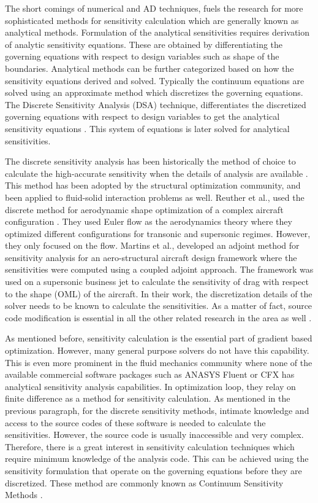The short comings of numerical and AD techniques, fuels the research for more sophisticated methods for sensitivity calculation which are generally known as analytical methods. Formulation of the analytical sensitivities requires derivation of analytic sensitivity equations. These are obtained by differentiating the governing equations with respect to design variables such as shape of the boundaries. Analytical methods can be further categorized based on how the sensitivity equations derived and solved. Typically the continuum equations are solved using an approximate method which discretizes the governing equations. The Discrete Sensitivity Analysis (DSA) technique, differentiates the discretized governing equations with respect to design variables to get the analytical sensitivity equations \cite{choi2006structural}. This system of equations is later solved for analytical sensitivities.  

The discrete sensitivity analysis has been historically the method of choice to calculate the high-accurate sensitivity when the details of analysis are available \cite{arora1979methods}. This method has been adopted by the structural optimization community, and been applied to fluid-solid interaction problems as well. Reuther et al., used the discrete method for aerodynamic shape optimization of a complex aircraft configuration \cite{reuther1999constrained}. They used Euler flow as the aerodynamics theory where they optimized different configurations for transonic and supersonic regimes. However, they only focused on the flow. Martins et al., developed an adjoint method for sensitivity analysis for an aero-structural aircraft design framework where the sensitivities were computed using a coupled adjoint approach. The framework was used on a supersonic business jet to calculate the sensitivity of drag with respect to the shape (OML) of the aircraft. In their work, the discretization details of the solver needs to be known to calculate the sensitivities. As a matter of fact, source code modification is essential in all the other related research in the area as well \cite{gamboa2009optimization, pandya1997gradient, kim2001aerodynamic}.

As mentioned before, sensitivity calculation is the essential part of gradient based optimization. However, many general purpose solvers do not have this capability. This is even more prominent in the fluid mechanics community where none of the available commercial software packages such as ANASYS Fluent or CFX has analytical sensitivity analysis capabilities. In optimization loop, they relay on finite difference as a method for sensitivity calculation. As mentioned in the previous paragraph, for the discrete sensitivity methods, intimate knowledge and access to the source codes of these software is needed to calculate the sensitivities. However, the source code is usually inaccessible and very complex. Therefore, there is a great interest in sensitivity calculation techniques which require minimum knowledge of the analysis code. This can be achieved using the sensitivity formulation that operate on the governing equations before they are discretized. These method are commonly known as Continuum Sensitivity Methods \cite{haftka1989recent}.

